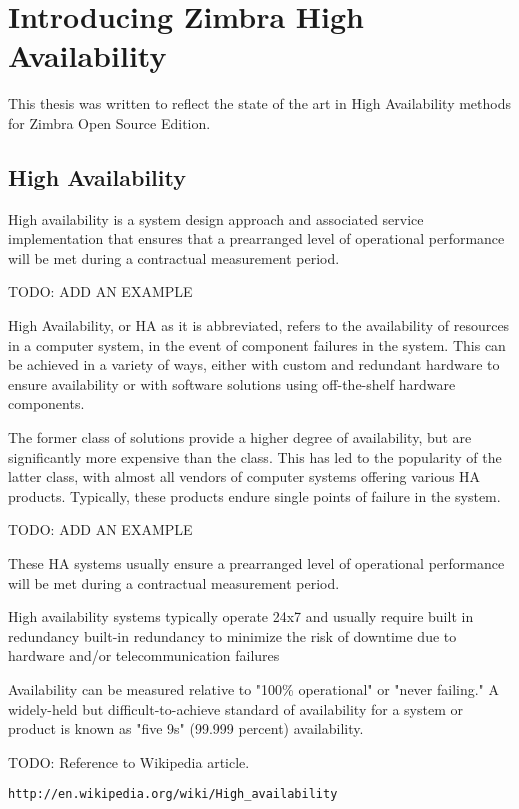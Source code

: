

\chapter{Introducing Zimbra High Availability}
This thesis was written to reflect the state of the art in High Availability methods for Zimbra Open Source Edition.  

\section {High Availability}
High availability is a system design approach and associated service implementation that ensures that a prearranged level of operational performance will be met during a contractual measurement period.

TODO: ADD AN EXAMPLE

High Availability, or HA as it is abbreviated, refers to the availability of resources in a computer system, in the event of component failures in the system. This can be achieved in a variety of ways, either with custom and redundant hardware to ensure availability or with software solutions using off-the-shelf hardware components.

The former class of solutions provide a higher degree of availability, but are significantly more expensive than the class. This has led to the popularity of the latter class, with almost all vendors of computer systems offering various HA products. Typically, these products endure single points of failure in the system.

TODO: ADD AN EXAMPLE

These HA systems usually ensure a prearranged level of operational performance will be met during a contractual measurement period. 

High availability systems typically operate 24x7 and usually require built in redundancy built-in redundancy to minimize the risk of downtime due to hardware and/or telecommunication failures

Availability can be measured relative to "100\% operational" or "never failing." A widely-held but difficult-to-achieve standard of availability for a system or product is known as "five 9s" (99.999 percent) availability.

TODO: Reference to Wikipedia article.
\begin{verbatim}
http://en.wikipedia.org/wiki/High_availability
\end{verbatim}


